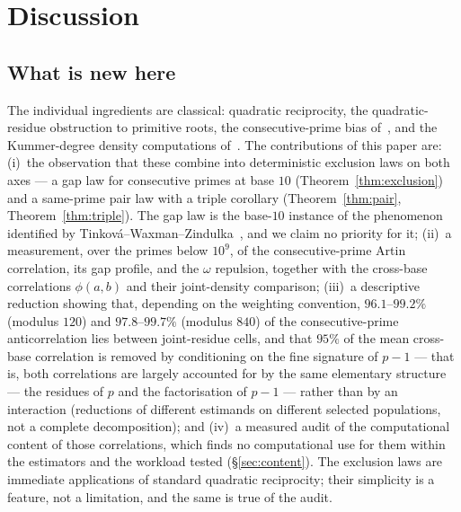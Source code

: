 \section{Discussion}
\label{sec:discussion}

\subsection*{What is new here}
The individual ingredients are classical: quadratic reciprocity, the quadratic-residue
obstruction to primitive roots, the consecutive-prime bias of~\cite{LOS2016}, and the
Kummer-degree density computations of~\cite{Matthews1976,MoreeStevenhagen2014}. The
contributions of this paper are: (i)~the observation that these combine into deterministic
exclusion laws on both axes --- a gap law for consecutive primes at base $10$
(Theorem~\ref{thm:exclusion}) and a same-prime pair law with a triple corollary
(Theorem~\ref{thm:pair}, Theorem~\ref{thm:triple}). The gap law is the base-$10$ instance of
the phenomenon identified by Tinkov\'a--Waxman--Zindulka~\cite{TinkovaWaxmanZindulka2023},
and we claim no priority for it; (ii)~a measurement, over the primes below $10^9$, of the
consecutive-prime Artin correlation, its gap profile, and the $\omega$ repulsion, together
with the cross-base correlations $\phi(a,b)$ and their joint-density comparison; (iii)~a
descriptive reduction showing that, depending on the weighting convention, $96.1$--$99.2\%$
(modulus $120$) and $97.8$--$99.7\%$ (modulus $840$) of the consecutive-prime anticorrelation
lies between joint-residue cells, and that $95\%$ of the mean
cross-base correlation is removed by conditioning on the fine signature of $p-1$ --- that is,
both correlations are largely accounted for by the same elementary structure
--- the residues of $p$ and the factorisation of $p-1$ --- rather than by an interaction
(reductions of different estimands on different selected populations, not a complete
decomposition); and (iv)~a measured audit of the computational content
of those correlations, which finds no computational use for them within the estimators and the
workload tested (\S\ref{sec:content}). The exclusion laws are immediate
applications of standard quadratic reciprocity; their simplicity is a feature, not a
limitation, and the same is true of the audit.

